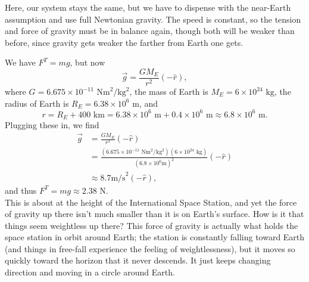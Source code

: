 \documentclass[]{article}
\begin{document}
\begin{TeacherMargin}
Here, our system stays the same, but we have to dispense with the near-Earth assumption and use full Newtonian gravity. The speed is constant, so the tension and force of gravity must be in balance again, though both will be weaker than before, since gravity gets weaker the farther from Earth one gets.
\begin{center}
\end{center}
We have $F^{T} = mg$, but now
\[
\vec{g} = \frac{GM_{E}}{r^{2}}(-\hat{r}),
\]
where $G = 6.675\times10^{-11}\text{ Nm}^{2}/\text{kg}^{2}$, the mass of Earth is $M_{E} = 6\times10^{24}\text{ kg}$, the radius of Earth is $R_{E} = 6.38\times10^{6}\text{ m}$, and
\[
r = R_{E} + 400\text{ km} = 6.38\times10^{6}\text{ m} + 0.4\times10^{6}\text{ m} \approx 6.8\times10^{6}\text{ m}.
\]
Plugging these in, we find
\begin{align*}
	\vec{g} & = \frac{GM_{E}}{r^{2}}(-\hat{r}) \\
	& = \frac{(6.675\times10^{-11}\text{ Nm}^{2}/\text{kg}^{2})(6\times10^{24}\text{ kg})}{(6.8\times10^{6}\text{m})^{2}}(-\hat{r}) \\
	& \approx 8.7\text{m/s}^{2}(-\hat{r}),
\end{align*}
and thus $F^{T} = mg \approx 2.38$ N. \\

\noindent This is about at the height of the International Space Station, and yet the force of gravity up there isn't much smaller than it is on Earth's surface. How is it that things seem weightless up there? This force of gravity is actually what holds the space station in orbit around Earth; the station is constantly falling toward Earth (and things in free-fall experience the feeling of weightlessness), but it moves so quickly toward the horizon that it never descends. It just keeps changing direction and moving in a circle around Earth.
\end{TeacherMargin}
\end{document}
